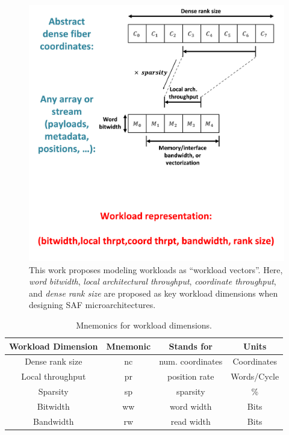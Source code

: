 \begin{figure}[H]
    \centering
    \includegraphics[width=\linewidth]{figures/workload_representation.png}
    \caption{This work proposes modeling workloads as ``workload vectors''. Here, \textit{word bitwidth},  \textit{local architectural throughput}, \textit{coordinate throughput}, and \textit{dense rank size} are proposed as key workload dimensions when designing SAF microarchitectures.}
    \label{fig:workload_representation}
\end{figure}

    \begin{table}[h]
        \centering
        \caption{Mnemonics for workload dimensions.}
        \label{table:workload_dimension_mnemonics}
        \begin{tabular}{||c|c|c|c||}
            \hline \hline
            Workload Dimension & Mnemonic & Stands for & Units \\
            \hline \hline
            Dense rank size & nc & num. coordinates & Coordinates \\
            \hline
            Local throughput & pr & position rate & Words/Cycle \\
            \hline
            Sparsity & sp & sparsity & \% \\
            \hline
            Bitwidth & ww & word width & Bits \\
            \hline
            Bandwidth & rw & read width & Bits \\
            \hline \hline
        \end{tabular}
    \end{table}

